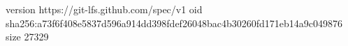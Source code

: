 version https://git-lfs.github.com/spec/v1
oid sha256:a73f6f408e5837d596a914dd398fdef26048bac4b30260fd171eb14a9c049876
size 27329
